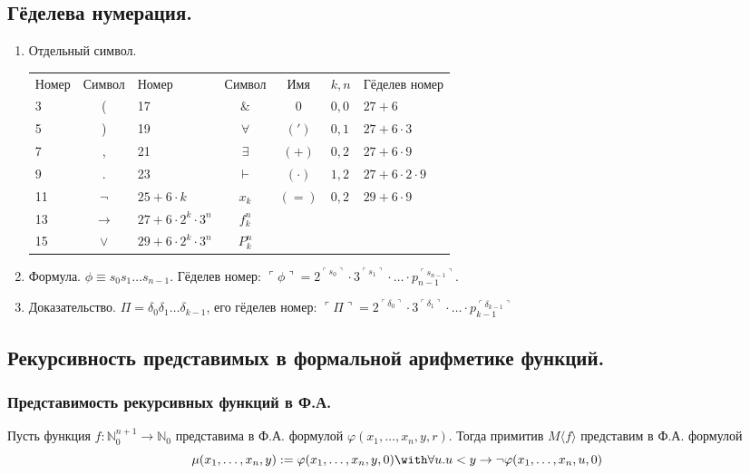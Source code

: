 \documentclass[10pt,a4paper,oneside]{article}
\begin{document}
\subsection{Гёделева нумерация.}
\begin{enumerate}
\item Отдельный символ.\vspace{0.2cm}

\begin{tabular}{lc|lc||cll}
Номер & Символ & Номер & Символ & Имя & $k,n$ & Гёделев номер\\
3 & ( &               17 & $\&$ &  0 & $0,0$ & $27 + 6$\\
5 & ) &               19 & $\forall$ & $(')$ & $0,1$ & $27 + 6 \cdot 3$\\
7 & , &               21 & $\exists$ & $(+)$ & $0,2$ & $27 + 6 \cdot 9$\\
9 & . &               23 & $\vdash$ & $(\cdot)$ & $1,2$ & $27 + 6 \cdot 2 \cdot 9$\\
11 & $\neg$ &         $25 + 6\cdot k$ & $x_k$ & $(=)$ & $0,2$ & $29 + 6 \cdot 9$\\
13 & $\rightarrow$ &  $27 + 6\cdot 2^k \cdot 3^n$ & $f_k^n$\\
15 & $\vee$ &         $29 + 6\cdot 2^k \cdot 3^n$ & $P_k^n$ 
\end{tabular}

\item Формула. $\phi \equiv s_0s_1\dots s_{n-1}$. Гёделев номер: $\ulcorner\phi\urcorner = 2^{\ulcorner s_0\urcorner}\cdot 3^{\ulcorner s_1\urcorner} 
\cdot \dots \cdot p_{n-1}^{\ulcorner s_{n-1}\urcorner}$.

\item Доказательство. $\Pi = \delta_0\delta_1\dots\delta_{k-1}$, его гёделев номер: $\ulcorner\Pi\urcorner =
2^{\ulcorner \delta_0\urcorner}\cdot 3^{\ulcorner \delta_1\urcorner} \cdot \dots \cdot p_{k-1}^{\ulcorner \delta_{k-1}\urcorner}$
\end{enumerate}

\subsection{Рекурсивность представимых в формальной арифметике функций.}
\subsubsection{Представимость рекурсивных функций в Ф.А.}
 Пусть функция $f:\mathbb{N}^{n+1}_0 \to \mathbb{N}_0$ представима в Ф.А.
формулой $\varphi(x_1,\dots,x_{n},y,r)$. Тогда примитив $M\langle f\rangle$ представим в Ф.А. 
формулой $$\mu(x_1,\dots,x_n,y) := \varphi(x_1,\dots,x_n,y,0) \with \forall u.u < y \to \neg\varphi(x_1,\dots,x_n,u,0)$$
\end{document}
